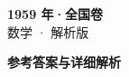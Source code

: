 \documentclass[zihao=-4, a4paper]{ctexart}
\begin{document}
\begin{center}
  {\Large\bfseries 1959 年·全国卷}\\[4pt]
  {\large 数学 · 解析版}
\end{center}
\medskip
{}

\clearpage
{}
\begin{center}{\Large\bfseries 参考答案与详细解析}\end{center}
\medskip

\end{document}
